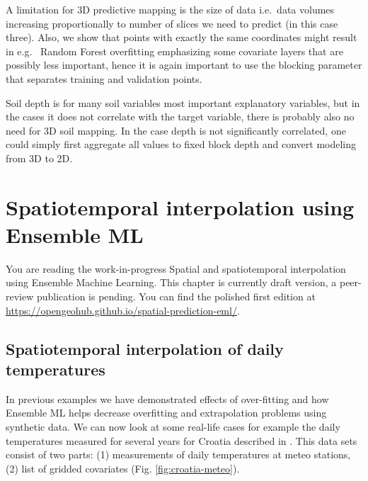\documentclass[
  graybox,natbib,nospthms]{svmono}
\begin{document}
A limitation for 3D predictive mapping is the size of data i.e.~data volumes
increasing proportionally to number of slices we need to predict (in this case three).
Also, we show that points with exactly the same coordinates might result in e.g.~
Random Forest overfitting emphasizing some covariate layers that are possibly
less important, hence it is again important to use the blocking parameter that
separates training and validation points.

Soil depth is for many soil variables most important explanatory variables, but
in the cases it does not correlate with the target variable, there is probably
also no need for 3D soil mapping. In the case depth is not significantly
correlated, one could simply first aggregate all values to fixed block depth and
convert modeling from 3D to 2D.

\hypertarget{spatiotemporal-interpolation-using-ensemble-ml}{%
\chapter{Spatiotemporal interpolation using Ensemble ML}\label{spatiotemporal-interpolation-using-ensemble-ml}}

You are reading the work-in-progress Spatial and spatiotemporal interpolation using Ensemble Machine Learning. This chapter is currently draft version, a peer-review publication is pending. You can find the polished first edition at \url{https://opengeohub.github.io/spatial-prediction-eml/}.

\hypertarget{spatiotemporal-interpolation-of-daily-temperatures}{%
\section{Spatiotemporal interpolation of daily temperatures}\label{spatiotemporal-interpolation-of-daily-temperatures}}

In previous examples we have demonstrated effects of over-fitting and
how Ensemble ML helps decrease overfitting and extrapolation problems
using synthetic data. We can now look at some real-life cases for example
the daily temperatures measured for several years for Croatia described in \citet{hengl2012spatio}.
This data sets consist of two parts: (1) measurements of daily temperatures at
meteo stations, (2) list of gridded covariates (Fig. \ref{fig:croatia-meteo}).
\end{document}
